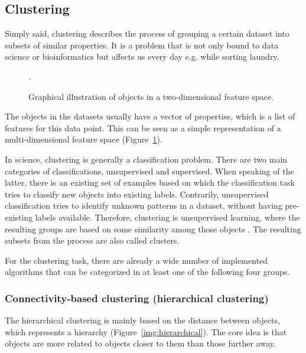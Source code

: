\documentclass[12pt,a4paper,english]{article}
\begin{document}
\subsection{Clustering}
	\label{ss:clustering}
    Simply said, clustering describes the process of grouping a certain dataset into subsets of similar properties. It is a problem that is not only bound to data science or bioinformatics but affects us every day e.g. while sorting laundry.
	\begin{figure}
		\centering
		\def\svgwidth{0.5\textwidth}
		\vspace{-20pt}
		
		\caption[Graphical illustration of objects in two-dimensional space.]{Graphical illustration of objects in a two-dimensional feature space.}.
		\label{img:base_cluster}
		\vspace{-20pt}
	\end{figure}

	The objects in the datasets usually have a vector of properties, which is a list of features for this data point. This can be seen as a simple representation of a multi-dimensional feature space (Figure~\ref{img:base_cluster}).

	In science, clustering is generally a classification problem.
	There are two main categories of classifications, unsupervised and supervised. When speaking of the latter, there is an existing set of examples based on which the classification task tries to classify new objects into existing labels.
	Contrarily, unsupervised classification tries to identify unknown patterns in a dataset, without having pre-existing labels available.
	Therefore, clustering is unsupervised learning, where the resulting groups are based on some similarity among those objects \citep{cl_technique:17}. 
	The resulting subsets from the process are also called clusters.

	For the clustering task, there are already a wide number of implemented algorithms that can be categorized in at least one of the following four groups.
	
\subsubsection*{Connectivity-based clustering (hierarchical clustering)}

	The hierarchical clustering is mainly based on the distance between objects, which represents a hierarchy (Figure~\ref{img:hierarchical}). The core idea is that objects are more related to objects closer to them than those further away.
		
\end{document}
